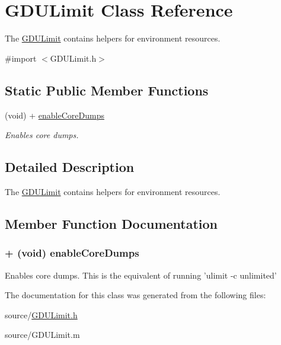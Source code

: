 \hypertarget{interface_g_d_u_limit}{
\section{GDULimit Class Reference}
\label{interface_g_d_u_limit}
}


The \hyperlink{interface_g_d_u_limit}{GDULimit} contains helpers for environment resources.  


{\ttfamily \#import $<$GDULimit.h$>$}\subsection*{Static Public Member Functions}
\begin{DoxyCompactItemize}
\item 
(void) + \hyperlink{interface_g_d_u_limit_ab657cde9b16d4cb6f5b77fd96fe917e0}{enableCoreDumps}
\begin{DoxyCompactList}\small\item\em Enables core dumps. \item\end{DoxyCompactList}\end{DoxyCompactItemize}


\subsection{Detailed Description}
The \hyperlink{interface_g_d_u_limit}{GDULimit} contains helpers for environment resources. 

\subsection{Member Function Documentation}
\hypertarget{interface_g_d_u_limit_ab657cde9b16d4cb6f5b77fd96fe917e0}{
\subsubsection[{enableCoreDumps}]{\setlength{\rightskip}{0pt plus 5cm}+ (void) enableCoreDumps }}
\label{interface_g_d_u_limit_ab657cde9b16d4cb6f5b77fd96fe917e0}


Enables core dumps. This is the equivalent of running 'ulimit -\/c unlimited' 

The documentation for this class was generated from the following files:\begin{DoxyCompactItemize}
\item 
source/\hyperlink{_g_d_u_limit_8h}{GDULimit.h}\item 
source/GDULimit.m\end{DoxyCompactItemize}
